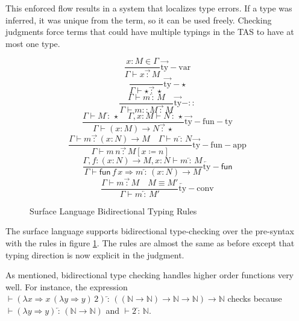 This enforced flow results in a system that localizes type errors.
If a type was inferred, it was unique from the term, so it can be
used freely. Checking judgments force terms that could have multiple
typings in the TAS to have at most one type.

\begin{figure}
\[
\frac{x:M\in\Gamma}{\Gamma\vdash x\overrightarrow{\,:\,}M}\operatorname{\overrightarrow{ty}-var}
\]
\[
\frac{\,}{\Gamma\vdash\star\overrightarrow{\,:\,}\star}\operatorname{\overrightarrow{ty}-\star}
\]
\[
\frac{\Gamma\vdash m\overleftarrow{\,:\,}M}{\Gamma\vdash m::M\overrightarrow{\,:\,}M}\operatorname{\overrightarrow{ty}-::}
\]
\[
\frac{\Gamma\vdash M\overleftarrow{\,:\,}\star\quad\Gamma,x:M\vdash N\overleftarrow{\,:\,}\star}{\Gamma\vdash\left(x:M\right)\rightarrow N\overrightarrow{\,:\,}\star}\operatorname{\overrightarrow{ty}-fun-ty}
\]
\[
\frac{\Gamma\vdash m\overrightarrow{\,:\,}\left(x:N\right)\rightarrow M\quad\Gamma\vdash n\overleftarrow{\,:\,}N}{\Gamma\vdash m\,n\overrightarrow{\,:\,}M\left[x\coloneqq n\right]}\operatorname{\overrightarrow{ty}-fun-app}
\]
\[
\frac{\Gamma,f:\left(x:N\right)\rightarrow M,x:N\vdash m\overleftarrow{\,:\,}M}{\Gamma\vdash\mathsf{fun}\,f\,x\Rightarrow m\overleftarrow{\,:\,}\left(x:N\right)\rightarrow M}\operatorname{\overleftarrow{ty}-\mathsf{fun}}
\]
\[
\frac{\Gamma\vdash m\overrightarrow{\,:\,}M\quad M\equiv M'}{\Gamma\vdash m\overleftarrow{\,:\,}M'}\operatorname{\overleftarrow{ty}-conv}
\]

\caption{Surface Language Bidirectional Typing Rules}
\label{fig:surface-bityping-rules}
\end{figure}


The surface language supports bidirectional type-checking over the
pre-syntax with the rules in figure \ref{fig:surface-bityping-rules}.
The rules are almost the same as before except that typing direction
is now explicit in the judgment.

As mentioned, bidirectional type checking handles higher order functions
very well. For instance, the expression $\vdash(\lambda x\Rightarrow x\,(\lambda y\Rightarrow y)\,2)\overleftarrow{\,:\,}\left(\left(\mathbb{N}\rightarrow\mathbb{N}\right)\rightarrow\mathbb{N}\rightarrow\mathbb{N}\right)\rightarrow\mathbb{N}$
checks because $\vdash(\lambda y\Rightarrow y)\overleftarrow{\,:\,}\left(\mathbb{N}\rightarrow\mathbb{N}\right)$
and $\vdash2\overleftarrow{\,:\,}\mathbb{N}$. 

